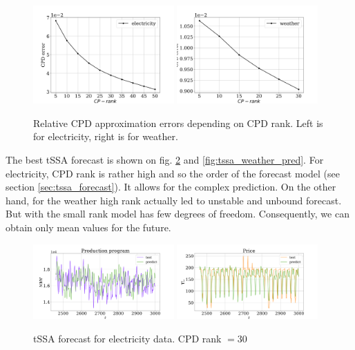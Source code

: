 \documentclass[referee, pdflatex]{sn-jnl}
\theoremstyle{definition}
\theoremstyle{plain}
\begin{document}
	\begin{figure}[h]
		\centering
		\includegraphics[width=0.48\textwidth, keepaspectratio]{../../experiments/electricity/tssa/figs/CPD_error.png}
		\includegraphics[width=0.48\textwidth, keepaspectratio]{../../experiments/weather/tssa/figs/CPD_error.png}
		\caption{Relative CPD approximation errors depending on CPD rank. Left is for electricity, right is for weather.}\label{fig:cpd_errors}
	\end{figure}
	
	The best tSSA forecast is shown on fig. \ref{fig:tssa_electr_pred} and \ref{fig:tssa_weather_pred}. For electricity, CPD rank is rather high and so the order of the forecast model (see section \ref{sec:tssa_forecast}). It allows for the complex prediction. On the other hand, for the weather high rank actually led to unstable and unbound forecast. But with the small rank model has few degrees of freedom. Consequently, we can obtain only mean values for the future.
	
	\begin{figure}[h]
		\centering
		\includegraphics[width=0.48\textwidth, keepaspectratio]{../../experiments/electricity/tssa/figs/prediction/cpd_rank_30/Production_program.png}
		\includegraphics[width=0.48\textwidth, keepaspectratio]{../../experiments/electricity/tssa/figs/prediction/cpd_rank_30/Price.png}
		\caption{tSSA forecast for electricity data. CPD rank $ = 30 $}\label{fig:tssa_electr_pred}
	\end{figure}
	
\end{document}
